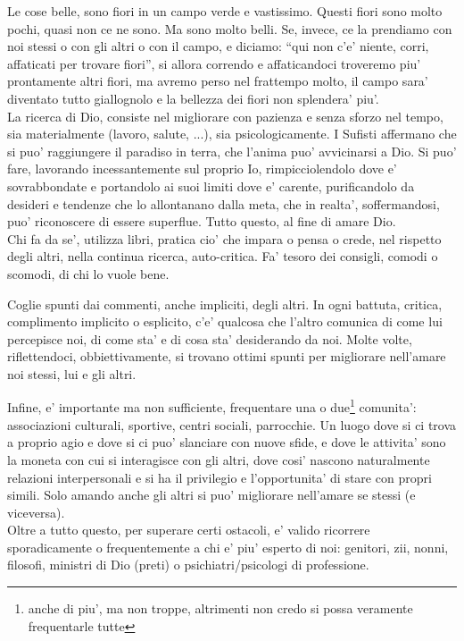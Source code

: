 Le cose belle, sono fiori in un campo verde e vastissimo. Questi fiori sono molto pochi, quasi non ce ne sono. Ma sono molto belli. Se, invece, ce la prendiamo con noi stessi o con gli altri o con il campo, e diciamo: ``qui non c'e' niente, corri, affaticati per trovare fiori'', si allora correndo e affaticandoci troveremo piu' prontamente altri fiori, ma avremo perso nel frattempo molto, il campo sara' diventato tutto giallognolo e la bellezza dei fiori non splendera' piu'.\\

La ricerca di Dio, consiste nel migliorare con pazienza e senza sforzo nel tempo, sia materialmente (lavoro, salute, ...), sia psicologicamente. I Sufisti affermano che si puo' raggiungere il paradiso in terra, che l'anima puo' avvicinarsi a Dio. Si puo' fare, lavorando incessantemente sul proprio Io, rimpicciolendolo dove e' sovrabbondate e portandolo ai suoi limiti dove e' carente, purificandolo da desideri e tendenze che lo allontanano dalla meta, che in realta', soffermandosi, puo' riconoscere di essere superflue. Tutto questo, al fine di amare Dio. \\

Chi fa da se', utilizza libri, pratica cio' che impara o pensa o crede, nel rispetto degli altri, nella continua ricerca, auto-critica. Fa' tesoro dei consigli, comodi o scomodi, di chi lo vuole bene.

Coglie spunti dai commenti, anche impliciti, degli altri. In ogni battuta, critica, complimento implicito o esplicito, c'e' qualcosa che l'altro comunica di come lui percepisce noi, di come sta' e di cosa sta' desiderando da noi. Molte volte, riflettendoci, obbiettivamente, si trovano ottimi spunti per migliorare nell'amare noi stessi, lui e gli altri.

Infine, e' importante ma non sufficiente, frequentare una o due\footnote{anche di piu', ma non troppe, altrimenti non credo si possa veramente frequentarle tutte} comunita': associazioni culturali, sportive, centri sociali, parrocchie. Un luogo dove si ci trova a proprio agio e dove si ci puo' slanciare con nuove sfide, e dove le attivita' sono la moneta con cui si interagisce con gli altri, dove cosi' nascono naturalmente relazioni interpersonali e si ha il privilegio e l'opportunita' di stare con propri simili. Solo amando anche gli altri si puo' migliorare nell'amare se stessi (e viceversa).\\

Oltre a tutto questo, per superare certi ostacoli, e' valido ricorrere sporadicamente o frequentemente a chi e' piu' esperto di noi: genitori, zii, nonni, filosofi, ministri di Dio (preti) o psichiatri/psicologi di professione.
